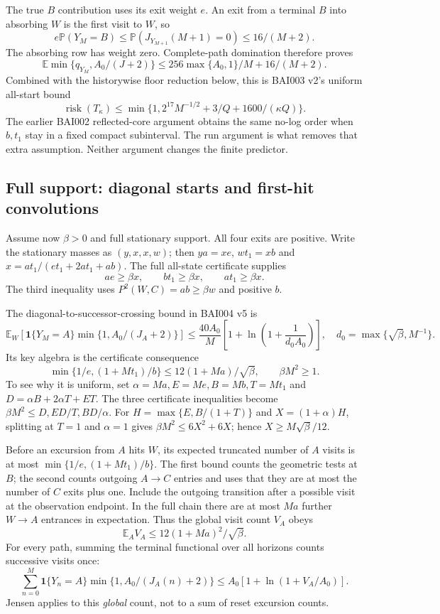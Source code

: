 \documentclass[11pt,letterpaper]{article}
\theoremstyle{definition}\newtheorem{definition}[theorem]{Definition}
\theoremstyle{remark}\newtheorem{remark}[theorem]{Remark}
\newcommand{\E}{\mathbb{E}}
\newcommand{\Prob}{\mathbb{P}}
\newcommand{\ind}{\mathbf{1}}
\newcommand{\unit}[1]{\textsf{#1}}
\begin{document}
The true $B$ contribution uses its exit weight $e$. An exit from a terminal $B$ into absorbing $W$ is the first visit to $W$, so
\[
 e\Prob(Y_M=B)
 \le\Prob(J_{Y_{M+1}}(M+1)=0)\le16/(M+2).
\]
The absorbing row has weight zero. Complete-path domination therefore proves
\[
 \E\min\{q_{Y_M},A_0/(J+2)\}
 \le256\max\{A_0,1\}/M+16/(M+2).
\]
Combined with the historywise floor reduction below, this is \unit{BAI003 v2}'s uniform all-start bound
\begin{equation}\label{eq:absorbingrisk}
 \operatorname{risk}(T_\kappa)
 \le\min\{1,2^{17}M^{-1/2}+3/Q+1600/(\kappa Q)\}.
\end{equation}
The earlier \unit{BAI002} reflected-core argument obtains the same no-log order when $b,t_1$ stay in a fixed compact subinterval. The run argument is what removes that extra assumption. Neither argument changes the finite predictor.

\subsection{Full support: diagonal starts and first-hit convolutions}
Assume now $\beta>0$ and full stationary support. All four exits are positive. Write the stationary masses as $(y,x,x,w)$; then
$ya=xe$, $wt_1=xb$ and $x=at_1/(et_1+2at_1+ab)$.
The full all-state certificate supplies
\[
 ae\ge\beta x,\qquad bt_1\ge\beta x,\qquad at_1\ge\beta x.
\]
The third inequality uses $P^2(W,C)=ab\ge\beta w$ and positive $b$.

The diagonal-to-successor-crossing bound in \unit{BAI004 v5} is
\begin{equation}\label{eq:diagcross}
 \E_W\!\left[\ind\{Y_M=A\}\min\{1,A_0/(J_A+2)\}\right]
 \le\frac{40A_0}{M}
 \left[1+\ln\left(1+\frac1{d_0A_0}\right)\right],
 \quad d_0=\max\{\sqrt\beta,M^{-1}\}.
\end{equation}
Its key algebra is the certificate consequence
\[
 \min\{1/e,(1+Mt_1)/b\}
 \le12(1+Ma)/\sqrt\beta,\qquad \beta M^2\ge1.
\]
To see why it is uniform, set
$\alpha=Ma,E=Me,B=Mb,T=Mt_1$ and
$D=\alpha B+2\alpha T+ET$. The three certificate inequalities become
$\beta M^2\le D,ED/T,BD/\alpha$.
For $H=\max\{E,B/(1+T)\}$ and $X=(1+\alpha)H$, splitting at $T=1$ and $\alpha=1$ gives
$\beta M^2\le6X^2+6X$; hence $X\ge M\sqrt\beta/12$.

Before an excursion from $A$ hits $W$, its expected truncated number of $A$ visits is at most
$\min\{1/e,(1+Mt_1)/b\}$.
The first bound counts the geometric tests at $B$; the second counts outgoing $A\to C$ entries and uses that they are at most the number of $C$ exits plus one. Include the outgoing transition after a possible visit at the observation endpoint. In the full chain there are at most $Ma$ further $W\to A$ entrances in expectation. Thus the global visit count $V_A$ obeys
\[
 \E_A V_A\le12(1+Ma)^2/\sqrt\beta .
\]
For every path, summing the terminal functional over all horizons counts successive visits once:
\[
 \sum_{n=0}^M
 \ind\{Y_n=A\}\min\{1,A_0/(J_A(n)+2)\}
 \le A_0[1+\ln(1+V_A/A_0)].
\]
Jensen applies to this \emph{global} count, not to a sum of reset excursion counts.
\end{document}
